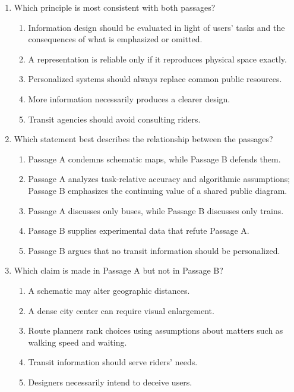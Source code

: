 \begin{enumerate}
\item Which principle is most consistent with both passages?
  \begin{enumerate}
  \item Information design should be evaluated in light of users' tasks and the
        consequences of what is emphasized or omitted.
  \item A representation is reliable only if it reproduces physical space exactly.
  \item Personalized systems should always replace common public resources.
  \item More information necessarily produces a clearer design.
  \item Transit agencies should avoid consulting riders.
  \end{enumerate}

\item Which statement best describes the relationship between the passages?
  \begin{enumerate}
  \item Passage A condemns schematic maps, while Passage B defends them.
  \item Passage A analyzes task-relative accuracy and algorithmic assumptions;
        Passage B emphasizes the continuing value of a shared public diagram.
  \item Passage A discusses only buses, while Passage B discusses only trains.
  \item Passage B supplies experimental data that refute Passage A.
  \item Passage B argues that no transit information should be personalized.
  \end{enumerate}

\item Which claim is made in Passage A but not in Passage B?
  \begin{enumerate}
  \item A schematic may alter geographic distances.
  \item A dense city center can require visual enlargement.
  \item Route planners rank choices using assumptions about matters such as
        walking speed and waiting.
  \item Transit information should serve riders' needs.
  \item Designers necessarily intend to deceive users.
  \end{enumerate}


\end{enumerate}
